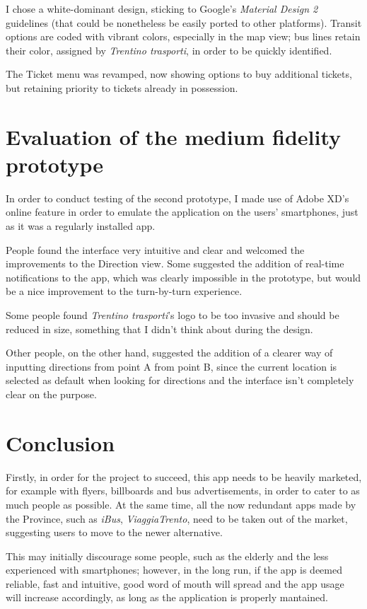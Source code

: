 \documentclass[11pt]{article}
\begin{document}
I chose a white-dominant design, sticking to Google's \textit{Material Design 2} guidelines (that could be nonetheless be easily ported to other platforms). Transit options are coded with vibrant colors, especially in the map view; bus lines retain their color, assigned by \textit{Trentino trasporti}, in order to be quickly identified.

The Ticket menu was revamped, now showing options to buy additional tickets, but retaining priority to tickets already in possession.

\section{Evaluation of the medium fidelity prototype}

In order to conduct testing of the second prototype, I made use of Adobe XD's online feature in order to emulate the application on the users' smartphones, just as it was a regularly installed app.

People found the interface very intuitive and clear and welcomed the improvements to the Direction view. Some suggested the addition of real-time notifications to the app, which was clearly impossible in the prototype, but would be a nice improvement to the turn-by-turn experience.

Some people found \textit{Trentino trasporti}'s logo to be too invasive and should be reduced in size, something that I didn't think about during the design.

Other people, on the other hand, suggested the addition of a clearer way of inputting directions from point A from point B, since the current location is selected as default when looking for directions and the interface isn't completely clear on the purpose.

\section{Conclusion}

Firstly, in order for the project to succeed, this app needs to be heavily marketed, for example with flyers, billboards and bus advertisements, in order to cater to as much people as possible. At the same time, all the now redundant apps made by the Province, such as \textit{iBus}, \textit{ViaggiaTrento}, need to be taken out of the market, suggesting users to move to the newer alternative.

This may initially discourage some people, such as the elderly and the less experienced with smartphones; however, in the long run, if the app is deemed reliable, fast and intuitive, good word of mouth will spread and the app usage will increase accordingly, as long as the application is properly mantained.
\end{document}
